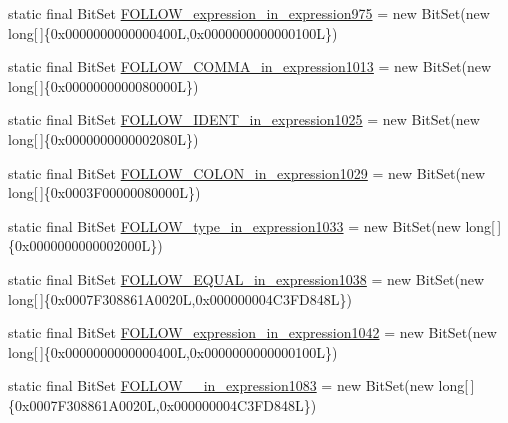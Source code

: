 \begin{DoxyCompactItemize}
\item 
static final Bit\-Set \hyperlink{classorg_1_1tzi_1_1use_1_1parser_1_1shell_1_1_shell_command_parser_a821b545b101e9acd3a08e70c6ba0956f}{F\-O\-L\-L\-O\-W\-\_\-expression\-\_\-in\-\_\-expression975} = new Bit\-Set(new long\mbox{[}$\,$\mbox{]}\{0x0000000000000400\-L,0x0000000000000100\-L\})
\item 
static final Bit\-Set \hyperlink{classorg_1_1tzi_1_1use_1_1parser_1_1shell_1_1_shell_command_parser_a274b604a4dca841a3ac30d87fc2bceb0}{F\-O\-L\-L\-O\-W\-\_\-\-C\-O\-M\-M\-A\-\_\-in\-\_\-expression1013} = new Bit\-Set(new long\mbox{[}$\,$\mbox{]}\{0x0000000000080000\-L\})
\item 
static final Bit\-Set \hyperlink{classorg_1_1tzi_1_1use_1_1parser_1_1shell_1_1_shell_command_parser_afbf36c7300d2d36b5528111b03341586}{F\-O\-L\-L\-O\-W\-\_\-\-I\-D\-E\-N\-T\-\_\-in\-\_\-expression1025} = new Bit\-Set(new long\mbox{[}$\,$\mbox{]}\{0x0000000000002080\-L\})
\item 
static final Bit\-Set \hyperlink{classorg_1_1tzi_1_1use_1_1parser_1_1shell_1_1_shell_command_parser_a8f91e56c6d950585633077b510790b93}{F\-O\-L\-L\-O\-W\-\_\-\-C\-O\-L\-O\-N\-\_\-in\-\_\-expression1029} = new Bit\-Set(new long\mbox{[}$\,$\mbox{]}\{0x0003\-F00000080000\-L\})
\item 
static final Bit\-Set \hyperlink{classorg_1_1tzi_1_1use_1_1parser_1_1shell_1_1_shell_command_parser_a47cd72343a2cc9258fee80a5cfb251f6}{F\-O\-L\-L\-O\-W\-\_\-type\-\_\-in\-\_\-expression1033} = new Bit\-Set(new long\mbox{[}$\,$\mbox{]}\{0x0000000000002000\-L\})
\item 
static final Bit\-Set \hyperlink{classorg_1_1tzi_1_1use_1_1parser_1_1shell_1_1_shell_command_parser_a3174667b0042efb684782348ace0c36a}{F\-O\-L\-L\-O\-W\-\_\-\-E\-Q\-U\-A\-L\-\_\-in\-\_\-expression1038} = new Bit\-Set(new long\mbox{[}$\,$\mbox{]}\{0x0007\-F308861\-A0020\-L,0x000000004\-C3\-F\-D848\-L\})
\item 
static final Bit\-Set \hyperlink{classorg_1_1tzi_1_1use_1_1parser_1_1shell_1_1_shell_command_parser_a10201d32584015c757db274f214cef2e}{F\-O\-L\-L\-O\-W\-\_\-expression\-\_\-in\-\_\-expression1042} = new Bit\-Set(new long\mbox{[}$\,$\mbox{]}\{0x0000000000000400\-L,0x0000000000000100\-L\})
\item 
static final Bit\-Set \hyperlink{classorg_1_1tzi_1_1use_1_1parser_1_1shell_1_1_shell_command_parser_a9e55f415a0f42f902eacaa58cc9567de}{F\-O\-L\-L\-O\-W\-\_\-\_\-in\-\_\-expression1083} = new Bit\-Set(new long\mbox{[}$\,$\mbox{]}\{0x0007\-F308861\-A0020\-L,0x000000004\-C3\-F\-D848\-L\})

\end{DoxyCompactItemize}
